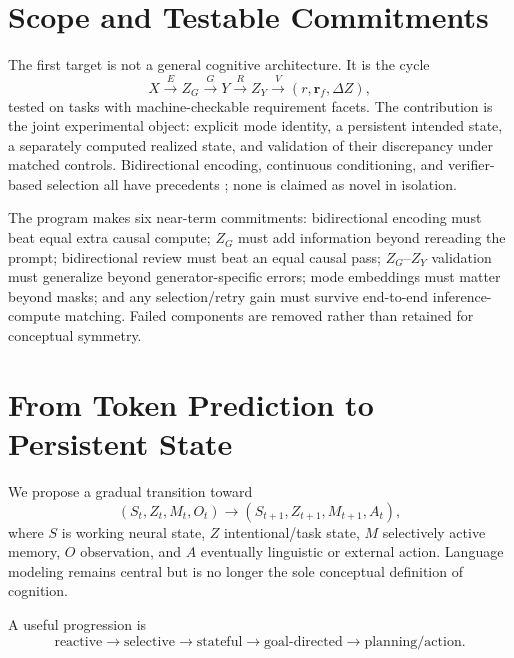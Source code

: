 \documentclass[11pt]{article}
\begin{document}
\section{Scope and Testable Commitments}
The first target is not a general cognitive architecture. It is the cycle
\begin{equation}
X\xrightarrow{E}Z_G\xrightarrow{G}Y\xrightarrow{R}Z_Y\xrightarrow{V}(r,\mathbf r_f,\Delta Z),
\end{equation}
tested on tasks with machine-checkable requirement facets. The contribution is the joint experimental object: explicit mode identity, a persistent intended state, a separately computed realized state, and validation of their discrepancy under matched controls. Bidirectional encoding, continuous conditioning, and verifier-based selection all have precedents \citep{dong2019unified,li2021prefixtuning,cobbe2021verifiers}; none is claimed as novel in isolation.

The program makes six near-term commitments: bidirectional encoding must beat equal extra causal compute; $Z_G$ must add information beyond rereading the prompt; bidirectional review must beat an equal causal pass; $Z_G$--$Z_Y$ validation must generalize beyond generator-specific errors; mode embeddings must matter beyond masks; and any selection/retry gain must survive end-to-end inference-compute matching. Failed components are removed rather than retained for conceptual symmetry.

\section{From Token Prediction to Persistent State}
We propose a gradual transition toward
\begin{equation}
(S_t,Z_t,M_t,O_t)\rightarrow(S_{t+1},Z_{t+1},M_{t+1},A_t),
\end{equation}
where $S$ is working neural state, $Z$ intentional/task state, $M$ selectively active memory, $O$ observation, and $A$ eventually linguistic or external action. Language modeling remains central but is no longer the sole conceptual definition of cognition.

A useful progression is
\begin{equation}
\text{reactive}\rightarrow\text{selective}\rightarrow\text{stateful}\rightarrow\text{goal-directed}\rightarrow\text{planning/action}.
\end{equation}
\end{document}
